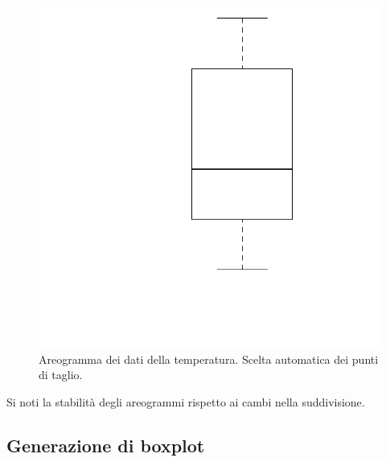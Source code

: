 \documentclass[onecolumn,12pt]{book}\usepackage[]{graphicx}\usepackage[]{color}
\makeatletter
\def\maxwidth{ %
  \ifdim\Gin@nat@width>\linewidth
    \linewidth
  \else
    \Gin@nat@width
  \fi
}
\newenvironment{knitrout}{}{} %
\makeatother
\begin{document}
\begin{figure}[htbp]
\begin{center}
\begin{knitrout}
{\centering \includegraphics[width=\maxwidth]{figure/graphics-unnamed-chunk-109-1} 

}



\end{knitrout}
\caption{ Areogramma dei dati della temperatura. Scelta automatica dei punti di taglio.}
\label{fig:datiistmilano}
\end{center}
\end{figure}
Si noti la stabilit\`a degli areogrammi rispetto ai cambi nella suddivisione.
\subsection{Generazione di boxplot}
\end{document}
